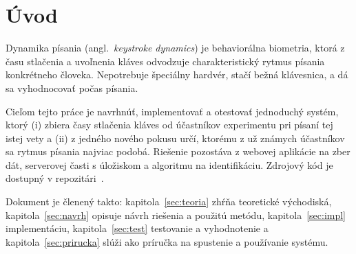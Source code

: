 \section{Úvod}

Dynamika písania (angl.\ \emph{keystroke dynamics}) je behaviorálna biometria,
ktorá z času stlačenia a uvoľnenia kláves odvodzuje charakteristický rytmus
písania konkrétneho človeka. Nepotrebuje špeciálny hardvér, stačí bežná
klávesnica, a dá sa vyhodnocovať počas písania.

Cieľom tejto práce je navrhnúť, implementovať a otestovať jednoduchý systém,
ktorý (i) zbiera časy stlačenia kláves od účastníkov experimentu pri písaní
tej istej vety a (ii) z jedného nového pokusu určí, ktorému z už známych
účastníkov sa rytmus písania najviac podobá. Riešenie pozostáva z webovej
aplikácie na zber dát, serverovej časti s úložiskom a algoritmu na
identifikáciu. Zdrojový kód je dostupný v repozitári~\cite{repo}.

Dokument je členený takto: kapitola~\ref{sec:teoria} zhŕňa teoretické
východiská, kapitola~\ref{sec:navrh} opisuje návrh riešenia a použitú metódu,
kapitola~\ref{sec:impl} implementáciu, kapitola~\ref{sec:test} testovanie
a vyhodnotenie a kapitola~\ref{sec:prirucka} slúži ako príručka na spustenie
a používanie systému.
